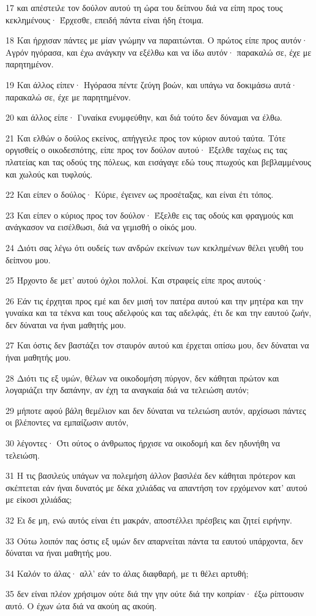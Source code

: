 \par 17 και απέστειλε τον δούλον αυτού τη ώρα του δείπνου διά να είπη προς τους κεκλημένους· Έρχεσθε, επειδή πάντα είναι ήδη έτοιμα.
\par 18 Και ήρχισαν πάντες με μίαν γνώμην να παραιτώνται. Ο πρώτος είπε προς αυτόν· Αγρόν ηγόρασα, και έχω ανάγκην να εξέλθω και να ίδω αυτόν· παρακαλώ σε, έχε με παρητημένον.
\par 19 Και άλλος είπεν· Ηγόρασα πέντε ζεύγη βοών, και υπάγω να δοκιμάσω αυτά· παρακαλώ σε, έχε με παρητημένον.
\par 20 και άλλος είπε· Γυναίκα ενυμφεύθην, και διά τούτο δεν δύναμαι να έλθω.
\par 21 Και ελθών ο δούλος εκείνος, απήγγειλε προς τον κύριον αυτού ταύτα. Τότε οργισθείς ο οικοδεσπότης, είπε προς τον δούλον αυτού· Έξελθε ταχέως εις τας πλατείας και τας οδούς της πόλεως, και εισάγαγε εδώ τους πτωχούς και βεβλαμμένους και χωλούς και τυφλούς.
\par 22 Και είπεν ο δούλος· Κύριε, έγεινεν ως προσέταξας, και είναι έτι τόπος.
\par 23 Και είπεν ο κύριος προς τον δούλον· Έξελθε εις τας οδούς και φραγμούς και ανάγκασον να εισέλθωσι, διά να γεμισθή ο οίκός μου.
\par 24 Διότι σας λέγω ότι ουδείς των ανδρών εκείνων των κεκλημένων θέλει γευθή του δείπνου μου.
\par 25 Ήρχοντο δε μετ' αυτού όχλοι πολλοί. Και στραφείς είπε προς αυτούς·
\par 26 Εάν τις έρχηται προς εμέ και δεν μισή τον πατέρα αυτού και την μητέρα και την γυναίκα και τα τέκνα και τους αδελφούς και τας αδελφάς, έτι δε και την εαυτού ζωήν, δεν δύναται να ήναι μαθητής μου.
\par 27 Και όστις δεν βαστάζει τον σταυρόν αυτού και έρχεται οπίσω μου, δεν δύναται να ήναι μαθητής μου.
\par 28 Διότι τις εξ υμών, θέλων να οικοδομήση πύργον, δεν κάθηται πρώτον και λογαριάζει την δαπάνην, αν έχη τα αναγκαία διά να τελειώση αυτόν;
\par 29 μήποτε αφού βάλη θεμέλιον και δεν δύναται να τελειώση αυτόν, αρχίσωσι πάντες οι βλέποντες να εμπαίζωσιν αυτόν,
\par 30 λέγοντες· Ότι ούτος ο άνθρωπος ήρχισε να οικοδομή και δεν ηδυνήθη να τελειώση.
\par 31 Η τις βασιλεύς υπάγων να πολεμήση άλλον βασιλέα δεν κάθηται πρότερον και σκέπτεται εάν ήναι δυνατός με δέκα χιλιάδας να απαντήση τον ερχόμενον κατ' αυτού με είκοσι χιλιάδας;
\par 32 Ει δε μη, ενώ αυτός είναι έτι μακράν, αποστέλλει πρέσβεις και ζητεί ειρήνην.
\par 33 Ούτω λοιπόν πας όστις εξ υμών δεν απαρνείται πάντα τα εαυτού υπάρχοντα, δεν δύναται να ήναι μαθητής μου.
\par 34 Καλόν το άλας· αλλ' εάν το άλας διαφθαρή, με τι θέλει αρτυθή;
\par 35 δεν είναι πλέον χρήσιμον ούτε διά την γην ούτε διά την κοπρίαν· έξω ρίπτουσιν αυτό. Ο έχων ώτα διά να ακούη ας ακούη.

